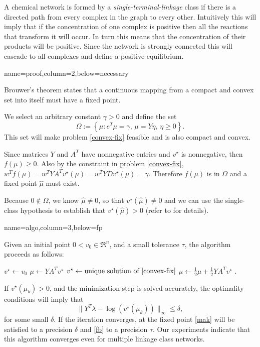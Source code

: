\documentclass[landscape]{baposter}
\newcommand*{\0}{\mathbf{0}}
\newcommand*{\1}{\mathbf{1}}
\begin{document}
\begin{poster}
{A chemical network is formed by a {\em single-terminal-linkage} class if there
is a directed path from every complex in the graph to every other. Intuitively
this will imply that if the concentration of one complex is positive then all
the reactions that transform it will occur. In turn this means that the
concentration of their products will be positive. Since the network is strongly
connected this will cascade to all complexes and define a positive equilibrium.
}

 {
 name=proof,column=2,below=necessary
 }
 {

Brouwer's theorem states that a continuous mapping from
a compact and convex set into itself must have a fixed point.

We select an arbitrary constant $\gamma>0$ and define the set
\[\Omega := \left\{ \mu:  e^T\mu = \gamma,\, \mu=Y\eta ,\,\eta\geq0  \right\}.\] This 
set will make problem \eqref{convex-fix} feasible and is also compact and convex.

Since matrices $Y$ and $A^T$ have nonnegative entries and $v^\star$ is nonnegative, then
$f(\mu)\geq0$. Also by the constraint in problem \ref{convex-fix},
$w^Tf(\mu) = w^TYA^Tv^\star(\mu) = w^TYDv^\star(\mu) = \gamma.$ Therefore $f(\mu)$ is in $\Omega$ and 
a fixed point $\hat\mu$ must exist.

Because $0\notin \Omega$, we know $\hat\mu \neq 0$, so that $v^\star(\hat\mu)\neq 0$ and we can use the single-class 
hypothesis to establish that $v^\star(\hat\mu)>0$ (refer to \cite{yyy-saund} for details).

 }

 {name=algo,column=3,below=fp}
 {
Given an initial point $0<v_0\in \Re^n$, and a small tolerance $\tau$, the algorithm proceeds as follows:
\begin{algorithmic}
  \STATE $v^\star \gets v_0$
  \STATE $\mu \gets YA^Tv^\star$
  \STATE $v^\star\gets \text{unique solution of \eqref{convex-fix}} $
	\STATE $\mu \gets \frac{1}{2}\mu +\frac{1}{2}YA^Tv^\star$
  \ENDWHILE
  \label{fixpoint-alg}.
\end{algorithmic}

If $v^\star(\mu_k)>0$, and the minimization step is solved accurately, the optimality
conditions will imply that \[\|Y^T\lambda-\log(v^\star(\mu_k))\|_\infty \leq \delta,\] for some small $\delta$. 
If the iteration converges, at the fixed point \eqref{mak} will
be satisfied to a precision $\delta$ and \eqref{fb} to a precision $\tau$. Our experiments 
indicate that this algorithm converges even for multiple linkage class networks.

}
\end{poster}
\end{document}

